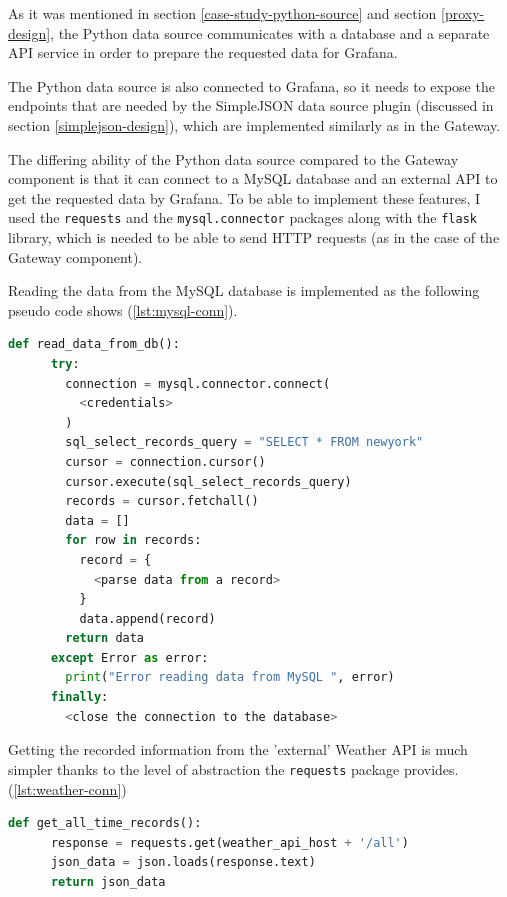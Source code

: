 As it was mentioned in section \ref{case-study-python-source} and section \ref{proxy-design}, the Python data source communicates with a database and a separate API service in order to prepare the requested data for Grafana.

The Python data source is also connected to Grafana, so it needs to expose the endpoints that are needed by the SimpleJSON data source plugin (discussed in section \ref{simplejson-design}), which are implemented similarly as in the Gateway.

The differing ability of the Python data source compared to the Gateway  component is that it can connect to a MySQL database and an external API to get the requested data by Grafana. To be able to implement these features, I used the \texttt{requests} and the \texttt{mysql.connector} packages along with the \texttt{flask} library, which is needed to be able to send HTTP requests (as in the case of the Gateway component).


Reading the data from the MySQL database is implemented as the following pseudo code shows (\ref{lst:mysql-conn}).

\begin{minipage}[b]{\linewidth}
	\centering
	\begin{lstlisting}[language=Python, frame=single, mathescape,%
	caption={Reading data from MySQL}, label=lst:mysql-conn]
	def read_data_from_db():
	  try:
	    connection = mysql.connector.connect(
	      <credentials>
	    )
	    sql_select_records_query = "SELECT * FROM newyork"
	    cursor = connection.cursor()
	    cursor.execute(sql_select_records_query)
	    records = cursor.fetchall()
	    data = []
	    for row in records:
	      record = {
	        <parse data from a record>
	      }
	      data.append(record)
	    return data
	  except Error as error:
	    print("Error reading data from MySQL ", error)
	  finally:
	    <close the connection to the database>
	\end{lstlisting}
\end{minipage}

Getting the recorded information from the 'external' Weather API is much simpler thanks to the level of abstraction the \texttt{requests} package provides. (\ref{lst:weather-conn})

\begin{minipage}[b]{\linewidth}
	\centering
	\begin{lstlisting}[language=Python, frame=single, mathescape,%
	caption={Reading data from the Weather API}, label=lst:weather-conn]
	def get_all_time_records():
	  response = requests.get(weather_api_host + '/all')
	  json_data = json.loads(response.text)
	  return json_data
	\end{lstlisting}
\end{minipage}

